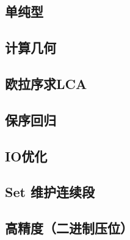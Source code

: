 \documentclass[a4paper,12pt]{article}
\begin{document}
\subsection{单纯型}

\subsection{计算几何}

\subsection{欧拉序求LCA}

\subsection{保序回归}

\subsection{IO优化}

\subsection{Set 维护连续段}

\subsection{高精度（二进制压位）}


\label{LastPage}
\end{document}
